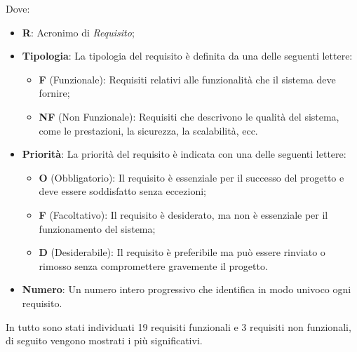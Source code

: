 Dove:
\begin{itemize}
    \item \textbf{R}: Acronimo di \textit{Requisito};
    \item \textbf{Tipologia}: La tipologia del requisito è definita da una delle seguenti lettere:
        \begin{itemize}
            \item \textbf{F} (Funzionale): Requisiti relativi alle funzionalità che il sistema deve fornire;
            \item \textbf{NF} (Non Funzionale): Requisiti che descrivono le qualità del sistema, come le prestazioni, la sicurezza, la scalabilità, ecc.
        \end{itemize}
    \item \textbf{Priorità}: La priorità del requisito è indicata con una delle seguenti lettere:
        \begin{itemize}
            \item \textbf{O} (Obbligatorio): Il requisito è essenziale per il successo del progetto e deve essere soddisfatto senza eccezioni;
            \item \textbf{F} (Facoltativo): Il requisito è desiderato, ma non è essenziale per il funzionamento del sistema;
            \item \textbf{D} (Desiderabile): Il requisito è preferibile ma può essere rinviato o rimosso senza compromettere gravemente il progetto.
        \end{itemize}
    \item \textbf{Numero}: Un numero intero progressivo che identifica in modo univoco ogni requisito.
\end{itemize}

\noindent In tutto sono stati individuati 19 requisiti funzionali e 3 requisiti non funzionali, di seguito vengono mostrati i più significativi.
